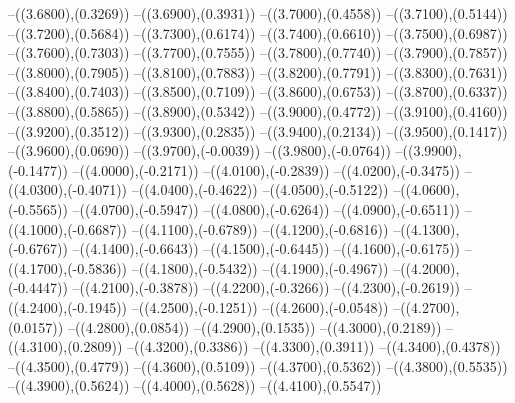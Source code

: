 {	--({\sx*(3.6800)},{\sy*(0.3269)})
	--({\sx*(3.6900)},{\sy*(0.3931)})
	--({\sx*(3.7000)},{\sy*(0.4558)})
	--({\sx*(3.7100)},{\sy*(0.5144)})
	--({\sx*(3.7200)},{\sy*(0.5684)})
	--({\sx*(3.7300)},{\sy*(0.6174)})
	--({\sx*(3.7400)},{\sy*(0.6610)})
	--({\sx*(3.7500)},{\sy*(0.6987)})
	--({\sx*(3.7600)},{\sy*(0.7303)})
	--({\sx*(3.7700)},{\sy*(0.7555)})
	--({\sx*(3.7800)},{\sy*(0.7740)})
	--({\sx*(3.7900)},{\sy*(0.7857)})
	--({\sx*(3.8000)},{\sy*(0.7905)})
	--({\sx*(3.8100)},{\sy*(0.7883)})
	--({\sx*(3.8200)},{\sy*(0.7791)})
	--({\sx*(3.8300)},{\sy*(0.7631)})
	--({\sx*(3.8400)},{\sy*(0.7403)})
	--({\sx*(3.8500)},{\sy*(0.7109)})
	--({\sx*(3.8600)},{\sy*(0.6753)})
	--({\sx*(3.8700)},{\sy*(0.6337)})
	--({\sx*(3.8800)},{\sy*(0.5865)})
	--({\sx*(3.8900)},{\sy*(0.5342)})
	--({\sx*(3.9000)},{\sy*(0.4772)})
	--({\sx*(3.9100)},{\sy*(0.4160)})
	--({\sx*(3.9200)},{\sy*(0.3512)})
	--({\sx*(3.9300)},{\sy*(0.2835)})
	--({\sx*(3.9400)},{\sy*(0.2134)})
	--({\sx*(3.9500)},{\sy*(0.1417)})
	--({\sx*(3.9600)},{\sy*(0.0690)})
	--({\sx*(3.9700)},{\sy*(-0.0039)})
	--({\sx*(3.9800)},{\sy*(-0.0764)})
	--({\sx*(3.9900)},{\sy*(-0.1477)})
	--({\sx*(4.0000)},{\sy*(-0.2171)})
	--({\sx*(4.0100)},{\sy*(-0.2839)})
	--({\sx*(4.0200)},{\sy*(-0.3475)})
	--({\sx*(4.0300)},{\sy*(-0.4071)})
	--({\sx*(4.0400)},{\sy*(-0.4622)})
	--({\sx*(4.0500)},{\sy*(-0.5122)})
	--({\sx*(4.0600)},{\sy*(-0.5565)})
	--({\sx*(4.0700)},{\sy*(-0.5947)})
	--({\sx*(4.0800)},{\sy*(-0.6264)})
	--({\sx*(4.0900)},{\sy*(-0.6511)})
	--({\sx*(4.1000)},{\sy*(-0.6687)})
	--({\sx*(4.1100)},{\sy*(-0.6789)})
	--({\sx*(4.1200)},{\sy*(-0.6816)})
	--({\sx*(4.1300)},{\sy*(-0.6767)})
	--({\sx*(4.1400)},{\sy*(-0.6643)})
	--({\sx*(4.1500)},{\sy*(-0.6445)})
	--({\sx*(4.1600)},{\sy*(-0.6175)})
	--({\sx*(4.1700)},{\sy*(-0.5836)})
	--({\sx*(4.1800)},{\sy*(-0.5432)})
	--({\sx*(4.1900)},{\sy*(-0.4967)})
	--({\sx*(4.2000)},{\sy*(-0.4447)})
	--({\sx*(4.2100)},{\sy*(-0.3878)})
	--({\sx*(4.2200)},{\sy*(-0.3266)})
	--({\sx*(4.2300)},{\sy*(-0.2619)})
	--({\sx*(4.2400)},{\sy*(-0.1945)})
	--({\sx*(4.2500)},{\sy*(-0.1251)})
	--({\sx*(4.2600)},{\sy*(-0.0548)})
	--({\sx*(4.2700)},{\sy*(0.0157)})
	--({\sx*(4.2800)},{\sy*(0.0854)})
	--({\sx*(4.2900)},{\sy*(0.1535)})
	--({\sx*(4.3000)},{\sy*(0.2189)})
	--({\sx*(4.3100)},{\sy*(0.2809)})
	--({\sx*(4.3200)},{\sy*(0.3386)})
	--({\sx*(4.3300)},{\sy*(0.3911)})
	--({\sx*(4.3400)},{\sy*(0.4378)})
	--({\sx*(4.3500)},{\sy*(0.4779)})
	--({\sx*(4.3600)},{\sy*(0.5109)})
	--({\sx*(4.3700)},{\sy*(0.5362)})
	--({\sx*(4.3800)},{\sy*(0.5535)})
	--({\sx*(4.3900)},{\sy*(0.5624)})
	--({\sx*(4.4000)},{\sy*(0.5628)})
	--({\sx*(4.4100)},{\sy*(0.5547)})
}
